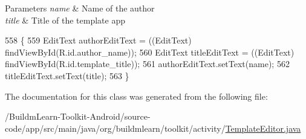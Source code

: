 \begin{DoxyParams}{Parameters}
{\em name} & Name of the author \\
\hline
{\em title} & Title of the template app \\
\hline
\end{DoxyParams}

\begin{DoxyCode}
558                                                                   \{
559         EditText authorEditText = ((EditText) findViewById(R.id.author\_name));
560         EditText titleEditText = ((EditText) findViewById(R.id.template\_title));
561         authorEditText.setText(name);
562         titleEditText.setText(title);
563     \}
\end{DoxyCode}


The documentation for this class was generated from the following file\-:\begin{DoxyCompactItemize}
\item 
/\-Buildm\-Learn-\/\-Toolkit-\/\-Android/source-\/code/app/src/main/java/org/buildmlearn/toolkit/activity/\hyperlink{TemplateEditor_8java}{Template\-Editor.\-java}\end{DoxyCompactItemize}
